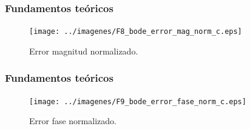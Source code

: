 \documentclass[10pt]{beamer}
\begin{document}
	\begin{frame}
		\frametitle{Fundamentos teóricos}
		\begin{figure}[hbtp]
			\caption{Error magnitud normalizado.}
			\centering
			\texttt{[image: ../imagenes/F8\_bode\_error\_mag\_norm\_c.eps]}
		\end{figure}
	\end{frame}	
	\begin{frame}
		\frametitle{Fundamentos teóricos}
		\begin{figure}[hbtp]
			\caption{Error fase normalizado.}
			\centering
			\texttt{[image: ../imagenes/F9\_bode\_error\_fase\_norm\_c.eps]}
		\end{figure}
	\end{frame}	
\end{document}
